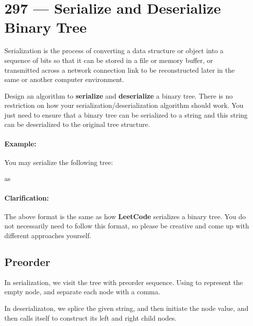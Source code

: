 \section{297 --- Serialize and Deserialize Binary Tree}
Serialization is the process of converting a data structure or object into a sequence of bits so that it can be stored in a file or memory buffer, or transmitted across a network connection link to be reconstructed later in the same or another computer environment.
\par
Design an algorithm to \textbf{serialize} and \textbf{deserialize} a binary tree. There is no restriction on how your serialization/deserialization algorithm should work. You just need to ensure that a binary tree can be serialized to a string and this string can be deserialized to the original tree structure.

\paragraph{Example: }

\begin{flushleft}
You may serialize the following tree:
\begin{figure}[H]
\end{figure}
as 
\end{flushleft}

\paragraph{Clarification:}
\begin{flushleft}
The above format is the same as how \textbf{LeetCode} serializes a binary tree. You do not necessarily need to follow this format, so please be creative and come up with different approaches yourself.
\end{flushleft}

\subsection{Preorder}
In serialization, we visit the tree with preorder sequence. Using  to represent the empty node, and separate each node with a comma.

In deserializaton, we splice the given string, and then initiate the node value, and then calls itself to construct its left and right child nodes.


